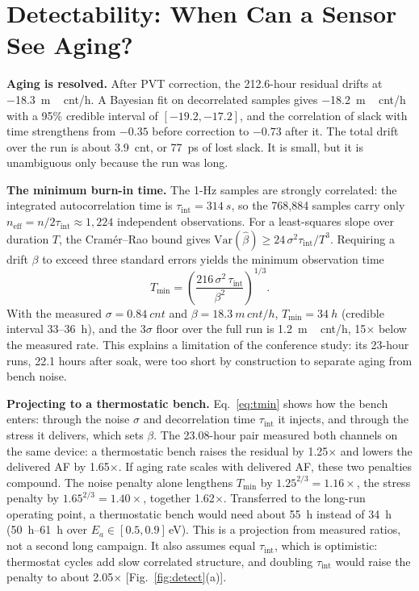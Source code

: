 \documentclass[10pt,twocolumn]{article}
\newcommand{\Tmin}{T_{\min}}
\newcommand{\tint}{\tau_{\mathrm{int}}}
\begin{document}
\section{Detectability: When Can a Sensor See Aging?}

\textbf{Aging is resolved.} After PVT correction, the 212.6-hour residual drifts at \SI{-18.3}{m\,cnt/h}. A Bayesian fit on decorrelated samples gives \SI{-18.2}{m\,cnt/h} with a 95\% credible interval of $[-19.2,-17.2]$, and the correlation of slack with time strengthens from $-0.35$ before correction to $-0.73$ after it. The total drift over the run is about \SI{3.9}{cnt}, or \SI{77}{ps} of lost slack. It is small, but it is unambiguous only because the run was long.

\textbf{The minimum burn-in time.} The 1-Hz samples are strongly correlated: the integrated autocorrelation time is $\tint=\SI{314}{s}$, so the 768,884 samples carry only $n_{\mathrm{eff}}=n/2\tint\approx1{,}224$ independent observations. For a least-squares slope over duration $T$, the Cram\'er--Rao bound gives $\mathrm{Var}(\hat\beta)\ge24\,\sigma^2\tint/T^3$. Requiring a drift $\beta$ to exceed three standard errors yields the minimum observation time
\begin{equation}
\Tmin=\left(\frac{216\,\sigma^2\,\tint}{\beta^2}\right)^{1/3}.
\label{eq:tmin}
\end{equation}
With the measured $\sigma=\SI{0.84}{cnt}$ and $\beta=\SI{18.3}{m\,cnt/h}$, $\Tmin=\SI{34}{h}$ (credible interval 33--\SI{36}{h}), and the 3$\sigma$ floor over the full run is \SI{1.2}{m\,cnt/h}, 15$\times$ below the measured rate. This explains a limitation of the conference study: its 23-hour runs, 22.1 hours after soak, were too short by construction to separate aging from bench noise.

\textbf{Projecting to a thermostatic bench.} Eq.~\eqref{eq:tmin} shows how the bench enters: through the noise $\sigma$ and decorrelation time $\tint$ it injects, and through the stress it delivers, which sets $\beta$. The 23.08-hour pair measured both channels on the same device: a thermostatic bench raises the residual by 1.25$\times$ and lowers the delivered AF by 1.65$\times$. If aging rate scales with delivered AF, these two penalties compound. The noise penalty alone lengthens $\Tmin$ by $1.25^{2/3}=1.16\times$, the stress penalty by $1.65^{2/3}=1.40\times$, together 1.62$\times$. Transferred to the long-run operating point, a thermostatic bench would need about \SI{55}{h} instead of \SI{34}{h} (\SIrange{50}{61}{h} over $E_a\in[0.5,0.9]$\,eV). This is a projection from measured ratios, not a second long campaign. It also assumes equal $\tint$, which is optimistic: thermostat cycles add slow correlated structure, and doubling $\tint$ would raise the penalty to about 2.05$\times$ [Fig.~\ref{fig:detect}(a)].
\end{document}
